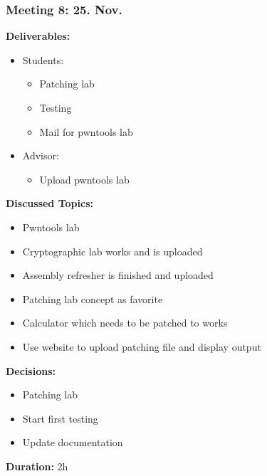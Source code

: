 \subsubsection*{Meeting 8: 25. Nov.}
\textbf{Deliverables:}
\begin{itemize}
    \item Students:
    \begin{itemize}
        \item Patching lab
        \item Testing
        \item Mail for pwntools lab
    \end{itemize}
    \item Advisor:
    \begin{itemize}
        \item Upload pwntools lab
    \end{itemize}
\end{itemize} 
\textbf{Discussed Topics:}
\begin{itemize}
    \item Pwntools lab
    \item Cryptographic lab works and is uploaded
    \item Assembly refresher is finished and uploaded
    \item Patching lab concept as favorite
    \item Calculator which needs to be patched to works
    \item Use website to upload patching file and display output
\end{itemize}
\textbf{Decisions:}
\begin{itemize}
    \item Patching lab 
    \item Start first testing
    \item Update documentation
\end{itemize}
\textbf{Duration:} 2h

\newpage
